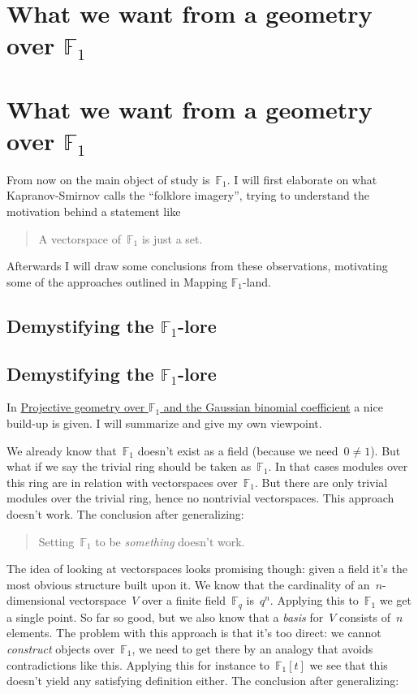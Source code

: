 \iftex
\section{What we want from a geometry over \texorpdfstring{$\mathbb{F}_1$}{F\_1}}
\fi
\ifblog
\section{What we want from a geometry over $\mathbb{F}_1$}
\fi

From now on the main object of study is~$\mathbb{F}_1$. I will first elaborate on what Kapranov-Smirnov calls the ``folklore imagery'', trying to understand the motivation behind a statement like

\begin{quote}
  A vectorspace of~$\mathbb{F}_1$ is just a set.
\end{quote}

Afterwards I will draw some conclusions from these observations, motivating some of the approaches outlined in \iftex\cite{mapping-fun}\fi\ifblog Mapping $\mathbb{F}_1$-land\fi.


\iftex
\subsection[Demystifying the F\_1-lore]{Demystifying the $\mathbb{F}_1$-lore}
\fi
\ifblog
\subsection{Demystifying the $\mathbb{F}_1$-lore}
\fi
In \iftex \cite{projective-geometry-over-f1} \fi\ifblog \href{http://arxiv.org/abs/math/0407093}{Projective geometry over $\mathbb{F}_1$ and the Gaussian binomial coefficient} \fi a nice build-up is given. I will summarize and give my own viewpoint.

We already know that~$\mathbb{F}_1$ doesn't exist as a field (because we need~$0\neq 1$). But what if we say the trivial ring should be taken as~$\mathbb{F}_1$. In that cases modules over this ring are in relation with vectorspaces over~$\mathbb{F}_1$. But there are only trivial modules over the trivial ring, hence no nontrivial vectorspaces. This approach doesn't work. The conclusion after generalizing:

\begin{quote}
  Setting~$\mathbb{F}_1$ to be \emph{something} doesn't work.
\end{quote}

The idea of looking at vectorspaces looks promising though: given a field it's the most obvious structure built upon it. We know that the cardinality of an~$n$\nobreakdash-dim\-ensional vectorspace~$V$ over a finite field~$\mathbb{F}_q$ is~$q^n$. Applying this to~$\mathbb{F}_1$ we get a single point. So far so good, but we also know that a \emph{basis} for~$V$ consists of~$n$ elements. The problem with this approach is that it's too direct: we cannot \emph{construct} objects over~$\mathbb{F}_1$, we need to get there by an analogy that avoids contradictions like this. Applying this for instance to~$\mathbb{F}_1[t]$ we see that this doesn't yield any satisfying definition either. The conclusion after generalizing:

